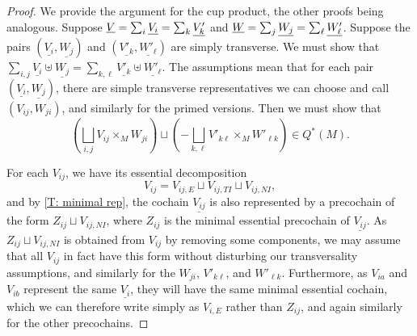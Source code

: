 \begin{proof}
	We provide the argument for the cup product, the other proofs being analogous.
	Suppose $\underline{V} = \sum_i \underline{V_i} = \sum_k \underline{V'_k}$ and $\underline{W} = \sum_j \underline{W_j} = \sum_\ell \underline{W'_\ell}$.
	Suppose the pairs $(\underline{V_i},\underline{W_j})$ and $(\underline{V'_k},\underline{W'_\ell})$ are simply transverse.
	We must show that $\sum_{i,j} \underline{V_i}\uplus \underline{W_j} = \sum_{k,\ell} \underline{V'_k}\uplus \underline{W'_\ell}$.
	The assumptions mean that for each pair $(\underline{V_i},\underline{W_j})$, there are simple transverse representatives we can choose and call $(V_{ij}, W_{ji})$, and similarly for the primed versions.
	Then we must show that $$\left(\bigsqcup_{i,j} V_{ij} \times_M W_{ji}\right) \sqcup \left(-\bigsqcup_{k,\ell} V'_{k\ell} \times_M W'_{\ell k}\right) \in Q^*(M).$$

	For each $V_{ij}$, we have its essential decomposition $$V_{ij} = V_{ij,E} \sqcup V_{ij,TI} \sqcup V_{ij,NI},$$
	and by \cref{T: minimal rep}, the cochain $\underline{V_{ij}}$ is also represented by a precochain of the form $Z_{ij} \sqcup V_{ij,NI}$, where $Z_{ij}$ is the minimal essential precochain of $\underline{V_{ij}}$.
	As $Z_{ij} \sqcup V_{ij,NI}$ is obtained from $V_{ij}$ by removing some components, we may assume that all $V_{ij}$ in fact have this form without disturbing our transversality assumptions, and similarly for the $W_{ji}$, $V'_{k\ell}$, and $W'_{\ell k}$.
	Furthermore, as $V_{ia}$ and $V_{ib}$ represent the same $\underline{V_i}$, they will have the same minimal essential cochain, which we can therefore write simply as $V_{i,E}$ rather than $Z_{ij}$, and again similarly for the other precochains.

	\begin{comment}
	Next, let us choose for each $j$ and $\ell$ particular representatives $W_j$ and $W'_\ell$ for $\underline{W_j}$ and $\underline{W'_\ell}$.
	By the same argument as just above, the essential component of this $W_j$ is the same as that of the other $W_{ji,E}$ up to trivial terms, so, again abusing notation but with no negative impact, we can take the essential component of $W_j$ to also be $W_{j,E}$, and the notation is consistent.
	Similarly for the $W'_\ell$.
	\end{comment}
	\begin{comment} Again we can decompose each $W_j$ into $W_{j,E} \sqcup W_{j,TI} \sqcup W_{j,NI}$, and by Corollary \ref{C: Q essential}, we can throw out some trivial components (which contribute trivial fiber products) and assume that these are the same $W_{j,E}$ as above.
		Similarly for the $W'_\ell$.
		As each $W_{j,TI}$ and $W'_{\ell,TI}$ is in $Q^*(M)$, it follow from Lemma \ref{L: Lipy12} that
		$$\left(\bigsqcup_j \left(W_{j,E} \sqcup W_{j,NI}\right)\right) \sqcup \left(-\bigsqcup_\ell \left(W'_{\ell,E} \sqcup W'_{\ell,NI}\right)\right) \in Q^*(M).$$
	\end{comment}


\end{proof}
